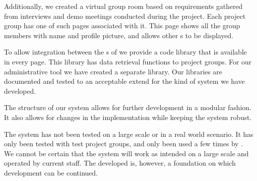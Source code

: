Additionally, we created a virtual group room based on requirements gathered from interviews and demo meetings conducted during the project.
Each project group has one of such pages associated with it.
This page shows all the group members with name and profile picture, and allows other \block{}s to be displayed.

To allow integration between the \subsystem{}s of \system{} we provide a code library that is available in every \moodle{} page.
This library has data retrieval functions to project groups.
For our administrative tool we have created a separate library.
Our libraries are documented and tested to an acceptable extend for the kind of system we have developed.

The structure of our system allows for further development in a modular fashion.
It also allows for changes in the implementation while keeping the system robust.

The system has not been tested on a large scale or in a real world scenario.
It has only been tested with test project groups, and only been used a few times by \admpers{}.
We cannot be certain that the system will work as intended on a large scale and operated by current staff.
The developed \subsystem{} is, however, a foundation on which development can be continued.












